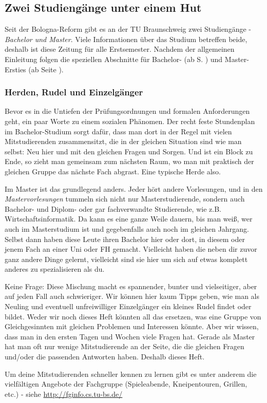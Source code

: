 \subsection{Zwei Studiengänge unter einem Hut}
	Seit der Bologna-Reform gibt es an der TU Braunschweig zwei Studiengänge - \textit{Bachelor und Master}. Viele Informationen über das Studium betreffen beide, deshalb ist diese Zeitung für alle Erstsemester. Nachdem der allgemeinen Einleitung folgen die speziellen Abschnitte für Bachelor- (ab S. \pageref{bachelor}) und Master-Ersties (ab Seite \pageref{master}).

\subsubsection{Herden, Rudel und Einzelgänger}
	Bevor es in die Untiefen der Prüfungsordnungen und formalen Anforderungen geht, ein paar Worte zu einem sozialen Phänomen. Der recht feste Stundenplan im Bachelor-Studium sorgt dafür, dass man dort in der Regel mit vielen Mitstudierenden zusammensitzt, die in der gleichen Situation sind wie man selbst: Neu hier und mit den gleichen Fragen und Sorgen. Und ist ein Block zu Ende, so zieht man gemeinsam zum nächsten Raum, wo man mit praktisch der gleichen Gruppe das nächste Fach abgrast. Eine typische Herde also.

	Im Master ist das grundlegend anders. Jeder hört andere Vorlesungen, und in den \emph{Mastervorlesungen} tummeln sich nicht nur Masterstudierende, sondern auch Bachelor- und Diplom- oder gar fachverwandte Studierende, wie z.B. Wirtschaftsinformatik. Da kann es eine ganze Weile dauern, bis man weiß, wer auch im Masterstudium ist und gegebenfalls auch noch im gleichen Jahrgang. Selbst dann haben diese Leute ihren Bachelor hier oder dort, in diesem oder jenem Fach an einer Uni oder FH gemacht. Vielleicht haben die neben dir zuvor ganz andere Dinge gelernt, vielleicht sind sie hier um sich auf etwas komplett anderes zu spezialisieren als du.

	Keine Frage: Diese Mischung macht es spannender, bunter und vielseitiger, aber auf jeden Fall auch schwieriger. Wir können hier kaum Tipps geben, wie man als Neuling und eventuell unfreiwilliger Einzelgänger ein kleines Rudel findet oder bildet. Weder wir noch dieses Heft könnten all das ersetzen, was eine Gruppe von Gleichgesinnten mit gleichen Problemen und Interessen könnte. Aber wir wissen, dass man in den ersten Tagen und Wochen viele Fragen hat. Gerade als Master hat man oft nur wenige Mitstudierende an der Seite, die die gleichen Fragen und/oder die passenden Antworten haben. Deshalb dieses Heft.

	Um deine Mitstudierenden schneller kennen zu lernen gibt es unter anderem die vielfältigen Angebote der Fachgruppe (Spieleabende, Kneipentouren, Grillen, etc.) - siehe \url{http://fginfo.cs.tu-bs.de/}
